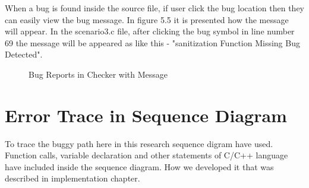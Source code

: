 When a bug is found inside the source file, if user click the bug location then they can easily view the bug message. In figure 5.5 it is presented how the message will appear. In the scenario3.c file,
after clicking the bug symbol in line number 69 the message will be appeared as like this - "sanitization
Function Missing Bug Detected".

\begin{figure}[htbp]
	\centering
	\label{bugDetectionWithMessage}
	\caption{Bug Reports in Checker with Message}
\end{figure}

\section{Error Trace in Sequence Diagram}

To trace the buggy path here in this research sequence digram have used. Function calls, variable declaration and other statements of C/C++ language have included inside the sequence diagram. How we developed it that was described in implementation chapter. 

